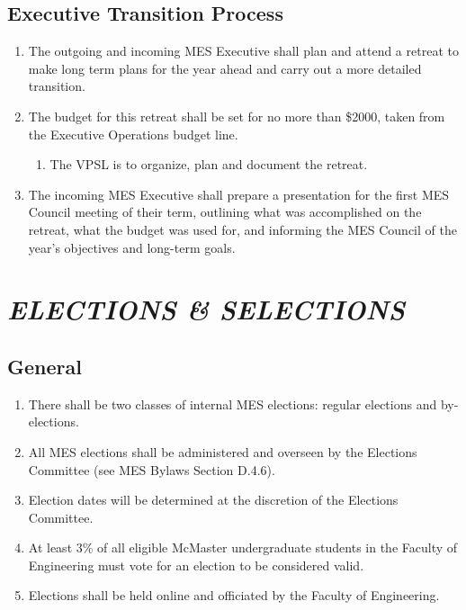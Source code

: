 \hypertarget{executive-transition-process}{%
 \subsection{Executive Transition
  Process}
 \label{executive-transition-process}}
\begin{enumerate}
 \item
  The outgoing and incoming MES Executive shall plan and attend a
  retreat to make long term plans for the year ahead and carry out a
  more detailed transition.
 \item
  The budget for this retreat shall be set for no more than \$2000,
  taken from the Executive Operations budget line.

  \begin{enumerate}
   \item
    The VPSL is to organize, plan and document the retreat.
  \end{enumerate}
 \item
  The incoming MES Executive shall prepare a presentation for the first
  MES Council meeting of their term, outlining what was accomplished on
  the retreat, what the budget was used for, and informing the MES
  Council of the year's objectives and long-term goals.
\end{enumerate}


\hypertarget{elections-selections}{%
 \section{\texorpdfstring{\emph{ELECTIONS \&
     SELECTIONS}}{ELECTIONS \& SELECTIONS}}
 \label{elections-selections}}
\hypertarget{general}{%
 \subsection{General}
 \label{general}}
\begin{enumerate}
 \item
  There shall be two classes of internal MES elections: regular
  elections and by-elections.
 \item
  All MES elections shall be administered and overseen by the Elections
  Committee (see MES Bylaws Section D.4.6).
 \item
  Election dates will be determined at the discretion of the Elections
  Committee.
 \item
  At least 3\% of all eligible McMaster undergraduate students in the
  Faculty of Engineering must vote for an election to be considered
  valid.
 \item
  Elections shall be held online and officiated by the Faculty of
  Engineering.

\end{enumerate}

